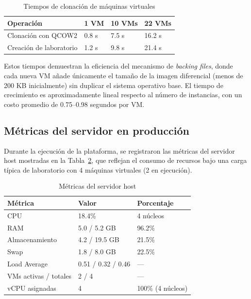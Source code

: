 \begin{table}[htbp]
\caption{Tiempos de clonación de máquinas virtuales}
\label{tab:clone_times}
\centering
\footnotesize
\begin{tabular}{p{2.5cm} p{2.5cm} p{2.5cm} p{2.5cm}}
\toprule
\textbf{Operación} & \textbf{1 VM} & \textbf{10 VMs} & \textbf{22 VMs} \\
\midrule
Clonación con QCOW2 & 0.8 s & 7.5 s & 16.2 s \\
Creación de laboratorio & 1.2 s & 9.8 s & 21.4 s \\
\bottomrule
\end{tabular}
\end{table}

Estos tiempos demuestran la eficiencia del mecanismo de \textit{backing files},
donde cada nueva VM añade únicamente el tamaño de la imagen diferencial (menos
de 200 KB inicialmente) sin duplicar el sistema operativo base. El tiempo de
crecimiento es aproximadamente lineal respecto al número de instancias, con un
costo promedio de 0.75--0.98 segundos por VM.

\subsection{Métricas del servidor en producción}

Durante la ejecución de la plataforma, se registraron las métricas del servidor
host mostradas en la Tabla~\ref{tab:host_metrics}, que reflejan el consumo de
recursos bajo una carga típica de laboratorio con 4 máquinas virtuales (2 en
ejecución).

\begin{table}[htbp]
\caption{Métricas del servidor host}
\label{tab:host_metrics}
\centering
\footnotesize
\begin{tabular}{p{3cm} p{3cm} p{3cm}}
\toprule
\textbf{Métrica} & \textbf{Valor} & \textbf{Porcentaje} \\
\midrule
CPU & 18.4\% & 4 núcleos \\
RAM & 5.0 / 5.2 GB & 96.2\% \\
Almacenamiento & 4.2 / 19.5 GB & 21.5\% \\
Swap & 1.8 / 8.0 GB & 22.5\% \\
Load Average & 0.51 / 0.32 / 0.46 & --- \\
VMs activas / totales & 2 / 4 & --- \\
vCPU asignadas & 4 & 100\% (4 núcleos) \\
\bottomrule
\end{tabular}
\end{table}

